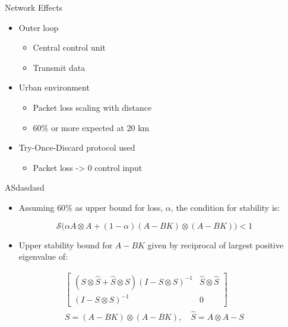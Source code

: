 \begin{frame}{Network Effects}
	\begin{itemize}
		\item Outer loop
		\begin{itemize}
			\item Central control unit
			\item Transmit data
		\end{itemize}
		\item Urban environment
		\begin{itemize}
			\item Packet loss scaling with distance
			\item $ 60\% $ or more expected at 20 km
		\end{itemize}
		\item Try-Once-Discard protocol used
		\begin{itemize}
			\item Packet loss -> 0 control input
		\end{itemize}
	\end{itemize}
	\begin{figure}[h!]
	\centering
	\resizebox{0.9\columnwidth}{!}{
		}
	\label{fig:tikzControlStructure}
\end{figure}
\end{frame}

\begin{frame}{ASdasdasd}
	\begin{itemize}
		\item Assuming $ 60\% $ as upper bound for loss, $ \alpha $, the condition for stability is:
	\end{itemize}
	\begin{equation}\label{eq:HuStabCondition}
		\mathcal{S}\Big(\alpha A \otimes A + (1-\alpha)(A-BK) \otimes (A-BK) \Big) < 1
	\end{equation}

	\end{frame}	
	
\begin{frame}
	\begin{itemize}
		\item Upper stability bound for $A-BK$ given by reciprocal of largest positive eigenvalue of:
	\end{itemize}
	\begin{equation}\label{eq:VMatrix}
	\begin{gathered}
		\begin{bmatrix} (S\otimes\hat{S}+\hat{S} \otimes S)(I - S\otimes S)^{-1} & \hat{S}\otimes\hat{S} \\ (I - S\otimes S)^{-1} & 0 \end{bmatrix} \\
		S = \left(A-BK\right) \otimes \left(A-BK\right), \quad \hat{S} = A \otimes A - S
	\end{gathered}
	\end{equation}
\end{frame}	
